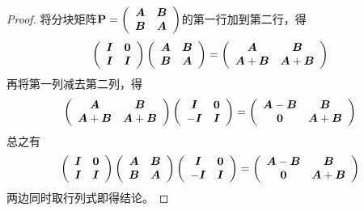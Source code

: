 \begin{frame}\ft{\secname}
\begin{proof}

  将分块矩阵$
  \PP = 
  \left(
    \begin{array}{cc}
      \A&\B\\
      \B&\A
    \end{array}
  \right)$的第一行加到第二行，得\pause
  $$
  \left(
    \begin{array}{cc}
      \II & \zero\\
      \II & \II
    \end{array}
  \right) \left(
    \begin{array}{cc}
      \A&\B\\
      \B&\A
    \end{array}
  \right) = \left(
    \begin{array}{cc}
      \A&\B\\
      \A+\B&\A+\B
    \end{array}
  \right)
  $$\pause
  再将第一列减去第二列，得\pause
  $$
  \left(
    \begin{array}{cc}
      \A&\B\\
      \A+\B&\A+\B
    \end{array}
  \right) \left(
    \begin{array}{cc}
      \II&\zero\\
      -\II&\II
    \end{array}
  \right) = \left(
    \begin{array}{cc}
      \A-\B & \B\\
      \zero & \A+\B
    \end{array}
  \right)
  $$\pause
  总之有
  $$
  \left(
    \begin{array}{cc}
      \II & \zero\\
      \II & \II
    \end{array}
  \right) \left(
    \begin{array}{cc}
      \A&\B\\
      \B&\A
    \end{array}
  \right) 
  \left(
    \begin{array}{cc}
      \II&\zero\\
      -\II&\II
    \end{array}
  \right) = \left(
    \begin{array}{cc}
      \A-\B & \B\\
      \zero & \A+\B
    \end{array}
  \right)
  $$
  两边同时取行列式即得结论。
\end{proof}
\end{frame}
